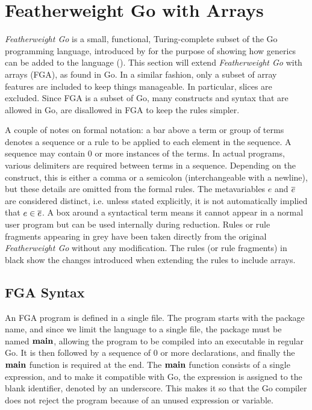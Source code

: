 \section{Featherweight Go with Arrays}
\label{ch:fg}

\emph{Featherweight Go} is a small, functional, Turing-complete subset of the Go
programming language, introduced by \citeauthor{fg} for the purpose of showing
how generics can be added to the language (\citeyear{fg}). This section will
extend \emph{Featherweight Go} with arrays (FGA), as found in Go. In a similar
fashion, only a subset of array features are included to keep things manageable.
In particular, slices are excluded. Since FGA is a subset of Go, many constructs
and syntax that are allowed in Go, are disallowed in FGA to keep the rules
simpler.

A couple of notes on formal notation: a bar above a term or group of terms
denotes a sequence or a rule to be applied to each element in the sequence. A
sequence may contain 0 or more instances of the terms. In actual programs,
various delimiters are required between terms in a sequence. Depending on the
construct, this is either a comma or a semicolon (interchangeable with a
newline), but these details are omitted from the formal rules. The metavariables
$e$ and $\overline{e}$ are considered distinct, i.e. unless stated explicitly, it is
not automatically implied that $e \in \overline{e}$. A box around a syntactical term
means it cannot appear in a normal user program but can be used internally
during reduction. Rules or rule fragments appearing in grey have been taken
directly from the original \emph{Featherweight Go} \autocite{fg} without any
modification. The rules (or rule fragments) in black show the changes introduced
when extending the rules to include arrays.

\subsection{FGA Syntax}

An FGA program is defined in a single file. The program starts with the package
name, and since we limit the language to a single file, the package must be
named $\texttt{\bf main}$, allowing the program to be compiled into an executable in regular
Go. It is then followed by a sequence of 0 or more declarations, and finally the
$\texttt{\bf main}$ function is required at the end. The $\texttt{\bf main}$ function consists of a
single expression, and to make it compatible with Go, the expression is assigned
to the blank identifier, denoted by an underscore. This makes it so that the Go
compiler does not reject the program because of an unused expression or
variable.

